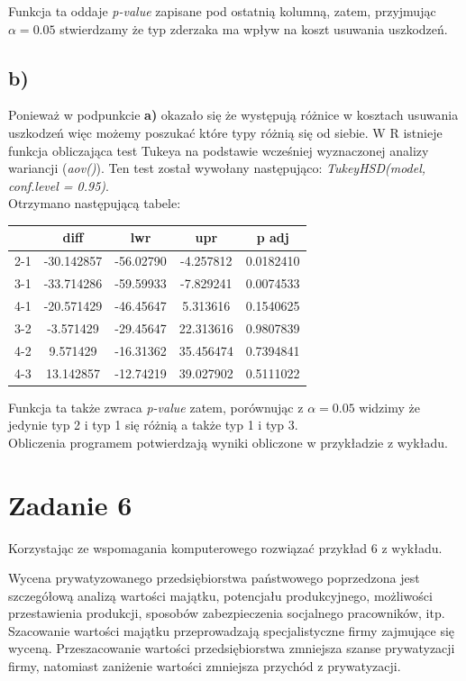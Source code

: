 \documentclass{article}
\begin{document}
Funkcja ta oddaje \textit{p-value} zapisane pod ostatnią kolumną, zatem, przyjmując $\alpha = 0.05$ stwierdzamy że typ zderzaka ma wpływ na koszt usuwania uszkodzeń.

\subsection{b)}
Ponieważ w podpunkcie \textbf{a)} okazało się że występują różnice w kosztach usuwania uszkodzeń więc możemy poszukać które typy różnią się od siebie. W R istnieje funkcja obliczająca test Tukeya na podstawie wcześniej wyznaczonej analizy wariancji (\textit{aov()}). Ten test został wywołany następująco: \textit{TukeyHSD(model, conf.level = 0.95)}. \\
Otrzymano następującą tabele:
\begin{center} \begin{tabular}{|c|c|c|c|c|} \hline
& diff & lwr & upr & p adj \\ \hline
2-1 & -30.142857 & -56.02790 & -4.257812 & 0.0182410 \\ \hline
3-1 & -33.714286 & -59.59933 & -7.829241 & 0.0074533 \\ \hline
4-1 & -20.571429 & -46.45647 & 5.313616 & 0.1540625 \\ \hline
3-2 & -3.571429 & -29.45647 & 22.313616 & 0.9807839 \\ \hline
4-2 & 9.571429 & -16.31362 & 35.456474 & 0.7394841 \\ \hline
4-3 & 13.142857 & -12.74219 & 39.027902 & 0.5111022 \\ \hline
\end{tabular} \end{center}

Funkcja ta także zwraca \textit{p-value} zatem, porównując z $\alpha = 0.05$ widzimy że jedynie typ 2 i typ 1 się różnią a także typ 1 i typ 3. \\
Obliczenia programem potwierdzają wyniki obliczone w przykładzie z wykładu.

\newpage
\section{Zadanie 6}
Korzystając ze wspomagania komputerowego rozwiązać przykład 6 z wykładu. \\ \par

Wycena prywatyzowanego przedsiębiorstwa państwowego poprzedzona jest szczegółową analizą wartości majątku, potencjału produkcyjnego, możliwości przestawienia produkcji, sposobów zabezpieczenia socjalnego pracowników, itp. Szacowanie wartości majątku przeprowadzają specjalistyczne firmy zajmujące się wyceną. Przeszacowanie wartości przedsiębiorstwa zmniejsza szanse prywatyzacji firmy, natomiast zaniżenie wartości zmniejsza przychód z prywatyzacji. \\
\end{document}
